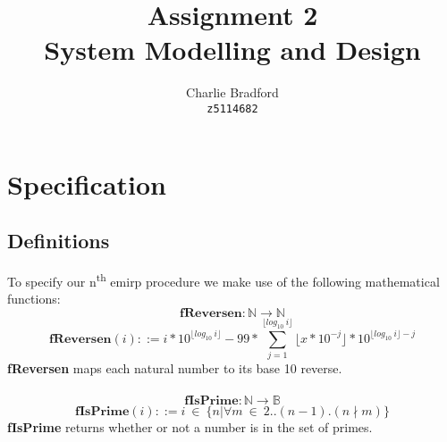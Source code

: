 \documentclass[a4paper]{article}
\title{%
		\huge Assignment 2 \\
\large System Modelling and Design}
\author{
		Charlie Bradford\\
		\texttt{z5114682}}
\begin{document}
\vspace{2 in}
\maketitle



\section{Specification}
 
\subsection{Definitions}
To specify our n\textsuperscript{th} emirp procedure we make use of the following mathematical functions:
$$ \textbf{fReversen}: \mathbb{N} \rightarrow \mathbb{N}$$
$$ \textbf{fReversen}(i) ::= i*10^{\lfloor log_{10}\ i\rfloor} - 99 * \sum_{j=1}^{\lfloor log_{10}\ i\rfloor}\lfloor x*10^{-j} \rfloor * 10^{\lfloor log_{10}\ i \rfloor-j} $$
\textbf{fReversen} maps each natural number to its base 10 reverse.
\\\\
$$ \textbf{fIsPrime}: \mathbb{N} \rightarrow \mathbb{B}$$
$$ \textbf{fIsPrime}(i) ::= i\ \in\ \{n|\forall m\ \in\ 2..(n-1).(n\nmid m)\} $$
\textbf{fIsPrime} returns whether or not a number is in the set of primes.
\end{document}
